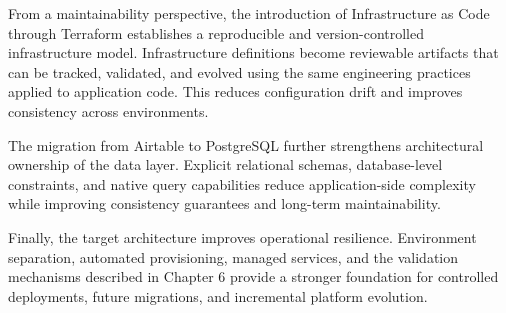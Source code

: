 From a maintainability perspective, the introduction of Infrastructure as Code through Terraform establishes a reproducible and version-controlled infrastructure model. Infrastructure definitions become reviewable artifacts that can be tracked, validated, and evolved using the same engineering practices applied to application code. This reduces configuration drift and improves consistency across environments.

The migration from Airtable to PostgreSQL further strengthens architectural ownership of the data layer. Explicit relational schemas, database-level constraints, and native query capabilities reduce application-side complexity while improving consistency guarantees and long-term maintainability.

Finally, the target architecture improves operational resilience. Environment separation, automated provisioning, managed services, and the validation mechanisms described in Chapter 6 provide a stronger foundation for controlled deployments, future migrations, and incremental platform evolution.
